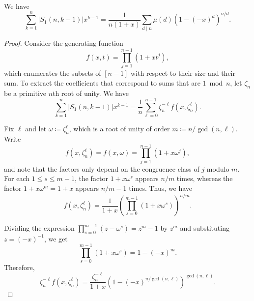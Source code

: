 \documentclass[10pt,a4paper]{amsart}
\newcommand{\card}[1]{\left|#1\right|}
\newcommand{\nroot}{\zeta_n} %
\begin{document}
\begin{lemma}
    \label{lem:S1}
    We have
$$
 \sum_{k=1}^n\card{S_1(n,k-1)}x^{k-1}=\frac{1}{n(1+x)} \sum_{d \mid n} \mu(d) \left(1 - (-x)^d\right)^{n/d}.
  $$  
\end{lemma}

\begin{proof}
Consider the generating function
\[    
    f(x,t) = \prod_{j = 1}^{n - 1} (1 + xt^j),
\]
which enumerates the subsets of $[n - 1]$ with respect to their size and their sum. To extract the coefficients that correspond to sums that are $1 \bmod n$, let $\nroot$ be a primitive $n$th root of unity. We have
\begin{equation}
    \label{eq:fourier}
   \sum_{k=1}^n\card{S_1(n,k-1)}x^{k-1}=
    \frac{1}{n} \sum_{\ell = 0}^{n - 1} \nroot^{-\ell} f(x,\nroot^\ell).
\end{equation}

    Fix $\ell$ and let $\omega\coloneqq\nroot^\ell$, which is a root
    of unity of order $m\coloneqq n / {\gcd(n, \ell)}$. Write 
    \begin{equation*}
        f(x,\nroot^\ell) = f(x,\omega)= \prod_{j = 1}^{n - 1} (1 + x \omega^j),
    \end{equation*}
    and note that the factors only depend on the congruence class of $j$ modulo $m$. For each $1\le s\le m-1$, the factor $1 + x \omega^s$ appears $n/m$ times, whereas the factor $1 + x \omega^m=1 + x$ appears $n/m-1$ times. Thus, we have
    \begin{equation*}
        f(x,\nroot^\ell)
        =
        \frac{1}{1 + x} \left(\prod_{s = 0}^{m-1} (1 + x \omega^s)\right)^{n/m}.
    \end{equation*}
    
    Dividing the expression $\prod_{s=0}^{m-1}(z-\omega^s)=z^m-1$ by $z^m$ and substituting $z=(-x)^{-1}$, we get 
    \begin{equation*}
        \prod_{s = 0}^{m-1} (1 + x \omega^s)
        =
        1 - (-x)^m.
    \end{equation*}
    Therefore,
    \begin{equation*}
        \nroot^{-\ell} f(x,\nroot^\ell)
        =
        \frac{\nroot^{-\ell}}{1+x} \left(1 - (-x)^{n / {\gcd(n,\ell)}}\right)^{\gcd(n,\ell)}.
    \end{equation*}
    

\end{proof}
\end{document}
